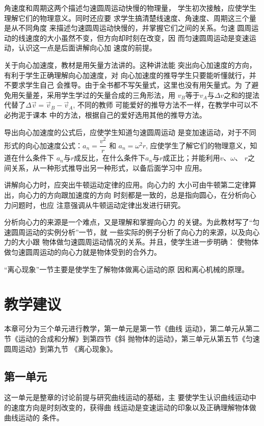 角速度和周期这两个描述匀速圆周运动快慢的物理量，
学生初次接触，应使学生理解它们的物理意义。同时还应要
求学生搞清楚线速度、角速度、周期这三个量是从不同角度
来描述匀速圆周运动快慢的，并掌握它们之间的关系。匀速
圆周运动的线速度的大小虽然不变，但方向却时刻在改变，因
而匀速圆周运动是变速运动，认识这一点是后面讲解向心加
速度的前提。

关于向心加速度，教材是用矢量方法讲的。这种讲法能
突出向心加速度的方向，有利于学生正确理解向心加速度，对
向心加速度的推导学生只要能听懂就行，并不要求学生自己
会推导。由于全书都不写矢量式，这里也没有用矢量式。为
了避免用矢量差，采用学生学过的矢量合成的三角形法，用
$v_B$等于$v_A$与$\Delta v$之和的提法代替了$\Delta \vec{v}=\vec{v}_B-\vec{v}_A$, 不同的教师
可能爱好的推导方法不一样，在教学中可以不必拘泥于课本
中的方法，根据自己的爱好选用其他的推导方法。

导出向心加速度的公式后，应使学生知道匀速圆周运动
是变加速运动，对于不同形式的向心加速度公式：$a_n=\dfrac{v^2}{r}$
和
$a_n=\omega^2 r$, 应使学生了解它们的物理意义，知道在什么条件下
$a_n$与$r$成反比，在什么条件下$a_n$与$r$成正比；并能利用$v$、$\omega$、
$r$之间关系，从一种形式推导出另一种形式，以备后面学习中
应用。

讲解向心力时，应突出牛顿运动定律的应用。向心力的
大小可由牛顿第二定律算出，向心力的方向跟加速度的方向
时刻都是一致的，总是指向圆心，在分析向心力问题时，也应
注意强调从牛顿运动定律出发进行研究。

分析向心力的来源是一个难点，又是理解和掌握向心力
的关键。为此教材写了“匀速圆周运动的实例分析”一节，就
一些实际的例子分析了向心力的来源，以及向心力的大小跟
物体做匀速圆周运动情况的关系。并且，使学生进一步明确：
使物体做匀速圆周运动的向心力就是物体受到的合外力。

“离心现象”一节主要是使学生了解物体做离心运动的原
因和离心机械的原理。

\section{教学建议}
本章可分为三个单元进行教学，第一单元是第一节《曲线
运动》，第二单元从第二节《运动的合成和分解》到第四节《斜
抛物体的运动》，第三单元从第五节《匀速圆周运动》到第九节
《离心现象》。

\subsection{第一单元}
这一单元是整章的讨论前提与研究曲线运动的基础，主
要使学生认识曲线运动中的速度方向是时刻改变的，获得曲
线运动是变速运动的印象以及正确理解物体做曲线运动的
条件。

